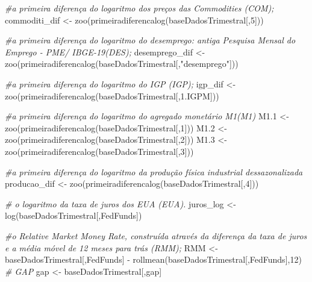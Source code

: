 \documentclass[
]{article}
\newenvironment{Shaded}{\begin{snugshade}}{\end{snugshade}}
\newcommand{\CommentTok}[1]{\textcolor[rgb]{0.56,0.35,0.01}{\textit{#1}}}
\newcommand{\DecValTok}[1]{\textcolor[rgb]{0.00,0.00,0.81}{#1}}
\newcommand{\FloatTok}[1]{\textcolor[rgb]{0.00,0.00,0.81}{#1}}
\newcommand{\FunctionTok}[1]{\textcolor[rgb]{0.00,0.00,0.00}{#1}}
\newcommand{\NormalTok}[1]{#1}
\newcommand{\OtherTok}[1]{\textcolor[rgb]{0.56,0.35,0.01}{#1}}
\newcommand{\SpecialCharTok}[1]{\textcolor[rgb]{0.00,0.00,0.00}{#1}}
\newcommand{\StringTok}[1]{\textcolor[rgb]{0.31,0.60,0.02}{#1}}
\begin{document}
\begin{Shaded}
\begin{Highlighting}[]
\CommentTok{\#a primeira diferença do logaritmo dos preços das Commodities (COM);}
\NormalTok{commoditi\_dif }\OtherTok{\textless{}{-}} \FunctionTok{zoo}\NormalTok{(}\FunctionTok{primeiradiferencalog}\NormalTok{(baseDadosTrimestral[,}\DecValTok{5}\NormalTok{]))}

\CommentTok{\#a primeira diferença do logaritmo do desemprego: antiga Pesquisa Mensal do Emprego {-} PME/ IBGE{-}19(DES);}
\NormalTok{desemprego\_dif }\OtherTok{\textless{}{-}} \FunctionTok{zoo}\NormalTok{(}\FunctionTok{primeiradiferencalog}\NormalTok{(baseDadosTrimestral[,}\StringTok{"desemprego"}\NormalTok{]))}

\CommentTok{\#a primeira diferença do logaritmo do IGP (IGP);}
\NormalTok{igp\_dif }\OtherTok{\textless{}{-}} \FunctionTok{zoo}\NormalTok{(}\FunctionTok{primeiradiferencalog}\NormalTok{(baseDadosTrimestral[,}\StringTok{\textquotesingle{}1.IGPM\textquotesingle{}}\NormalTok{]))}

\CommentTok{\#a primeira diferença do logaritmo do agregado monetário M1(M1)}
\NormalTok{M1}\FloatTok{.1} \OtherTok{\textless{}{-}} \FunctionTok{zoo}\NormalTok{(}\FunctionTok{primeiradiferencalog}\NormalTok{(baseDadosTrimestral[,}\DecValTok{1}\NormalTok{]))}
\NormalTok{M1}\FloatTok{.2} \OtherTok{\textless{}{-}} \FunctionTok{zoo}\NormalTok{(}\FunctionTok{primeiradiferencalog}\NormalTok{(baseDadosTrimestral[,}\DecValTok{2}\NormalTok{]))}
\NormalTok{M1}\FloatTok{.3} \OtherTok{\textless{}{-}} \FunctionTok{zoo}\NormalTok{(}\FunctionTok{primeiradiferencalog}\NormalTok{(baseDadosTrimestral[,}\DecValTok{3}\NormalTok{]))}

\CommentTok{\#a primeira diferença do logaritmo da produção física industrial dessazonalizada}
\NormalTok{producao\_dif }\OtherTok{\textless{}{-}} \FunctionTok{zoo}\NormalTok{(}\FunctionTok{primeiradiferencalog}\NormalTok{(baseDadosTrimestral[,}\DecValTok{4}\NormalTok{]))}

\CommentTok{\# o logaritmo da taxa de juros dos EUA (EUA).}
\NormalTok{juros\_log }\OtherTok{\textless{}{-}} \FunctionTok{log}\NormalTok{(baseDadosTrimestral[,}\StringTok{\textquotesingle{}FedFunds\textquotesingle{}}\NormalTok{])}

\CommentTok{\#o Relative Market Money Rate, construída através da diferença da taxa de juros e a média móvel de 12 meses para trás (RMM);}
\NormalTok{RMM }\OtherTok{\textless{}{-}}\NormalTok{ baseDadosTrimestral[,}\StringTok{\textquotesingle{}FedFunds\textquotesingle{}}\NormalTok{] }\SpecialCharTok{{-}} \FunctionTok{rollmean}\NormalTok{(baseDadosTrimestral[,}\StringTok{\textquotesingle{}FedFunds\textquotesingle{}}\NormalTok{],}\DecValTok{12}\NormalTok{)}
\CommentTok{\# GAP}
\NormalTok{gap }\OtherTok{\textless{}{-}}\NormalTok{ baseDadosTrimestral[,}\StringTok{\textquotesingle{}gap\textquotesingle{}}\NormalTok{]}


\end{Highlighting}
\end{Shaded}
\end{document}
